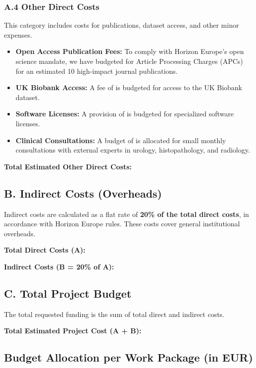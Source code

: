 \subsubsection*{A.4 Other Direct Costs}
This category includes costs for publications, dataset access, and other minor expenses.
\begin{itemize}
    \item \textbf{Open Access Publication Fees:} To comply with Horizon Europe's open science mandate, we have budgeted for Article Processing Charges (APCs) for an estimated 10 high-impact journal publications.
    \item \textbf{UK Biobank Access:} A fee of  is budgeted for access to the UK Biobank dataset.
    \item \textbf{Software Licenses:} A provision of  is budgeted for specialized software licenses.
    \item \textbf{Clinical Consultations:} A budget of  is allocated for small monthly consultations with external experts in urology, histopathology, and radiology.
\end{itemize}

\textbf{Total Estimated Other Direct Costs: }

\subsection*{B. Indirect Costs (Overheads)}
Indirect costs are calculated as a flat rate of \textbf{20\% of the total direct costs}, in accordance with Horizon Europe rules. These costs cover general institutional overheads.

\textbf{Total Direct Costs (A): }

\textbf{Indirect Costs (B = 20\% of A): }

\subsection*{C. Total Project Budget}
The total requested funding is the sum of total direct and indirect costs.

\textbf{Total Estimated Project Cost (A + B):} 

\subsection*{Budget Allocation per Work Package (in EUR)}

